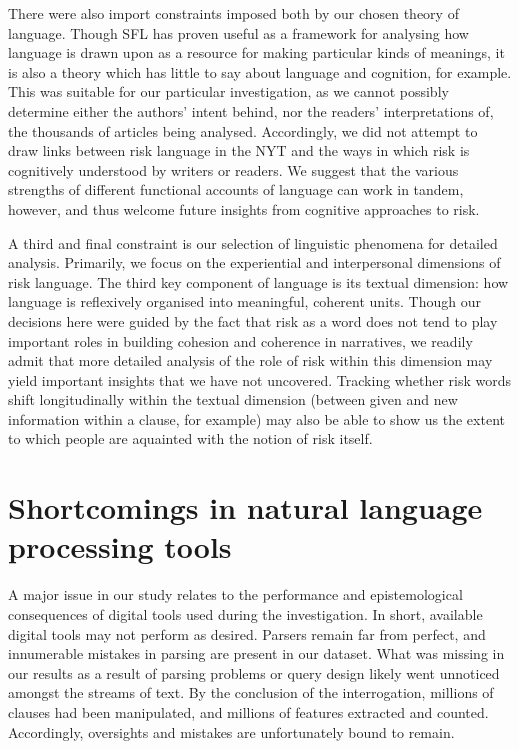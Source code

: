 There were also import constraints imposed both by our chosen theory of language. Though SFL has proven useful as a framework for analysing how language is drawn upon as a resource for making particular kinds of meanings, it is also a theory which has little to say about language and cognition, for example. This was suitable for our particular investigation, as we cannot possibly determine either the authors' intent behind, nor the readers' interpretations of, the thousands of articles being analysed. Accordingly, we did not attempt to draw links between risk language in the NYT and the ways in which risk is cognitively understood by writers or readers. We suggest that the various strengths of different functional accounts of language can work in tandem, however, and thus welcome future insights from cognitive approaches to risk.

A third and final constraint is our selection of linguistic phenomena for detailed analysis. Primarily, we focus on the experiential and interpersonal dimensions of risk language. The third key component of language is its textual dimension: how language is reflexively organised into meaningful, coherent units. Though our decisions here were guided by the fact that risk as a word does not tend to play important roles in building cohesion and coherence in narratives, we readily admit that more detailed analysis of the role of risk within this dimension may yield important insights that we have not uncovered. Tracking whether risk words shift longitudinally within the textual dimension (between given and new information within a clause, for example) may also be able to show us the extent to which people are aquainted with the notion of risk itself.

\section{Shortcomings in natural language processing tools}

A major issue in our study relates to the performance and epistemological consequences of digital tools used during the investigation. In short, available digital tools may not perform as desired. Parsers remain far from perfect, and innumerable mistakes in parsing are present in our dataset. What was missing in our results as a result of parsing problems or query design likely went unnoticed amongst the streams of text. By the conclusion of the interrogation, millions of clauses had been manipulated, and millions of features extracted and counted. Accordingly, oversights and mistakes are unfortunately bound to remain.

